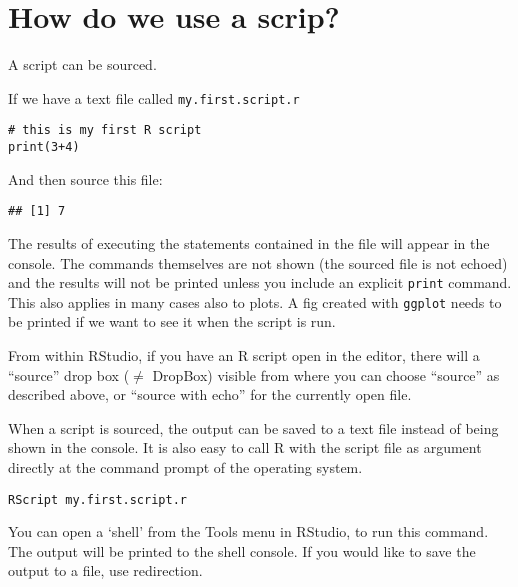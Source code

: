 \documentclass[paper=a4,10pt,div=17,headsepline,BCOR=12mm,twoside,open=right]{scrbook}\usepackage{knitr}
\begin{document}
\section{How do we use a scrip?}

A script can be sourced.

If we have a text file called \texttt{my.first.script.r}
\begin{verbatim}
# this is my first R script
print(3+4)
\end{verbatim}

And then source this file:

\begin{knitrout}\footnotesize
{}\color{fgcolor}\begin{kframe}
\begin{alltt}
\hlstd{(}\hlstd{)}
\end{alltt}
\begin{verbatim}
## [1] 7
\end{verbatim}
\end{kframe}
\end{knitrout}

The results of executing the statements contained in the file will appear in the console. The commands themselves are not shown (the sourced file is not echoed) and the results will not be printed unless you include an explicit \texttt{print} command. This also applies in many cases also to plots. A fig created with \texttt{ggplot} needs to be printed if we want to see it when the script is run.

From within RStudio, if you have an R script open in the editor, there will a ``source'' drop box ($\neq$ DropBox) visible from where you can choose ``source'' as described above, or ``source with echo'' for the currently open file.

When a script is sourced, the output can be saved to a text file instead of being shown in the console. It is also easy to call R with the script file as argument directly at the command prompt of the operating system.

\begin{verbatim}
RScript my.first.script.r
\end{verbatim}

You can open a `shell' from the Tools menu in RStudio, to run this command. The output will be printed to the shell console. If you would like to save the output to a file, use redirection.
\end{document}
